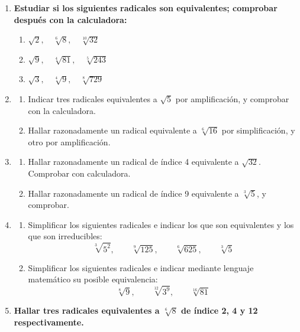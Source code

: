 \documentclass[10pt, a4paper]{article}
\begin{document}
\begin{enumerate}
    \item \textbf{Estudiar si los siguientes radicales son equivalentes; comprobar después con la calculadora:}
    \begin{enumerate}[label=\alph*)]
        \item $\sqrt{2}, \quad \sqrt[6]{8}, \quad \sqrt[10]{32}$
        \item $\sqrt{9}, \quad \sqrt[4]{81}, \quad \sqrt[5]{243}$
        \item $\sqrt{3}, \quad \sqrt[4]{9}, \quad \sqrt[8]{729}$
    \end{enumerate}

    \item 
    \begin{enumerate}[label=\alph*)]
        \item Indicar tres radicales equivalentes a $\sqrt{5}$ por amplificación, y comprobar con la calculadora.
        \item Hallar razonadamente un radical equivalente a $\sqrt[6]{16}$ por simplificación, y otro por amplificación.
    \end{enumerate}

    \item 
    \begin{enumerate}[label=\alph*)]
        \item Hallar razonadamente un radical de índice 4 equivalente a $\sqrt{32}$. Comprobar con calculadora.
        \item Hallar razonadamente un radical de índice 9 equivalente a $\sqrt[3]{5}$, y comprobar.
    \end{enumerate}

    \item 
    \begin{enumerate}[label=\alph*)]
        \item Simplificar los siguientes radicales e indicar los que son equivalentes y los que son irreducibles:
        \[ \sqrt[3]{5^2}, \qquad \sqrt[9]{125}, \qquad \sqrt[6]{625}, \qquad \sqrt[3]{5} \]
        \item Simplificar los siguientes radicales e indicar mediante lenguaje matemático su posible equivalencia:
        \[ \sqrt[8]{9}, \qquad \sqrt[12]{3^9}, \qquad \sqrt[16]{81} \]
    \end{enumerate}

    \item \textbf{Hallar tres radicales equivalentes a $\sqrt[6]{8}$ de índice 2, 4 y 12 respectivamente.}
\end{enumerate}
\end{document}
